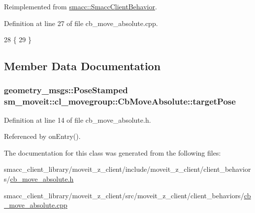 Reimplemented from \hyperlink{classsmacc_1_1SmaccClientBehavior_ac0cd72d42bd00425362a97c9803ecce5}{smacc\+::\+Smacc\+Client\+Behavior}.



Definition at line 27 of file cb\+\_\+move\+\_\+absolute.\+cpp.


\begin{DoxyCode}
28 \{
29 \}
\end{DoxyCode}


\subsection{Member Data Documentation}
\subsubsection[{\texorpdfstring{target\+Pose}{targetPose}}]{\setlength{\rightskip}{0pt plus 5cm}geometry\+\_\+msgs\+::\+Pose\+Stamped sm\+\_\+moveit\+::cl\+\_\+movegroup\+::\+Cb\+Move\+Absolute\+::target\+Pose}\hypertarget{classsm__moveit_1_1cl__movegroup_1_1CbMoveAbsolute_aba451c75e2dfda0bc38fd043a8b24ab5}{}\label{classsm__moveit_1_1cl__movegroup_1_1CbMoveAbsolute_aba451c75e2dfda0bc38fd043a8b24ab5}


Definition at line 14 of file cb\+\_\+move\+\_\+absolute.\+h.



Referenced by on\+Entry().



The documentation for this class was generated from the following files\+:\begin{DoxyCompactItemize}
\item 
smacc\+\_\+client\+\_\+library/moveit\+\_\+z\+\_\+client/include/moveit\+\_\+z\+\_\+client/client\+\_\+behaviors/\hyperlink{cb__move__absolute_8h}{cb\+\_\+move\+\_\+absolute.\+h}\item 
smacc\+\_\+client\+\_\+library/moveit\+\_\+z\+\_\+client/src/moveit\+\_\+z\+\_\+client/client\+\_\+behaviors/\hyperlink{cb__move__absolute_8cpp}{cb\+\_\+move\+\_\+absolute.\+cpp}\end{DoxyCompactItemize}
